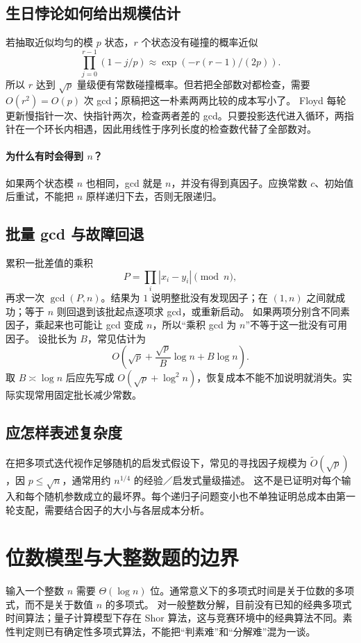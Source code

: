 \documentclass[UTF8,a4paper,11pt,twoside,openright,fontset=fandol]{ctexbook}
\theoremstyle{definition}
\begin{document}
\subsection{生日悖论如何给出规模估计}
若抽取近似均匀的模 $p$ 状态，$r$ 个状态没有碰撞的概率近似
\[
 \prod_{j=0}^{r-1}(1-j/p)\approx\exp(-r(r-1)/(2p)).
\]
所以 $r$ 达到 $\sqrt p$ 量级便有常数碰撞概率。但若把全部数对都检查，需要 $O(r^2)=O(p)$ 次 gcd；原稿把这一朴素两两比较的成本写小了。
Floyd 每轮更新慢指针一次、快指针两次，检查两者差的 gcd。只要投影迭代进入循环，两指针在一个环长内相遇，因此用线性于序列长度的检查数代替了全部数对。

\paragraph{为什么有时会得到 $n$？}
如果两个状态模 $n$ 也相同，gcd 就是 $n$，并没有得到真因子。应换常数 $c$、初始值后重试，不能把 $n$ 原样递归下去，否则无限递归。

\subsection{批量 gcd 与故障回退}
累积一批差值的乘积
\[
 P=\prod_i|x_i-y_i|\pmod n,
\]
再求一次 $\gcd(P,n)$。结果为 $1$ 说明整批没有发现因子；在 $(1,n)$ 之间就成功；等于 $n$ 则回退到该批起点逐项求 gcd，或重新启动。
如果两项分别含不同素因子，乘起来也可能让 gcd 变成 $n$，所以“乘积 gcd 为 $n$”不等于这一批没有可用因子。
设批长为 $B$，常见估计为
\[
 O\left(\sqrt p+\frac{\sqrt p}{B}\log n+B\log n\right).
\]
取 $B\asymp\log n$ 后应先写成 $O(\sqrt p+\log^2n)$，恢复成本不能不加说明就消失。实际实现常用固定批长减少常数。

\subsection{应怎样表述复杂度}
在把多项式迭代视作足够随机的启发式假设下，常见的寻找因子规模为 $\widetilde O(\sqrt p)$，因 $p\le\sqrt n$，通常用约 $n^{1/4}$ 的经验／启发式量级描述。
这不是已证明对每个输入和每个随机参数成立的最坏界。每个递归子问题变小也不单独证明总成本由第一轮支配，需要结合因子的大小与各层成本分析。

\section{位数模型与大整数题的边界}
输入一个整数 $n$ 需要 $\Theta(\log n)$ 位。通常意义下的多项式时间是关于位数的多项式，而不是关于数值 $n$ 的多项式。
对一般整数分解，目前没有已知的经典多项式时间算法；量子计算模型下存在 Shor 算法，这与竞赛环境中的经典算法不同。素性判定则已有确定性多项式算法，不能把“判素难”和“分解难”混为一谈。
\end{document}
